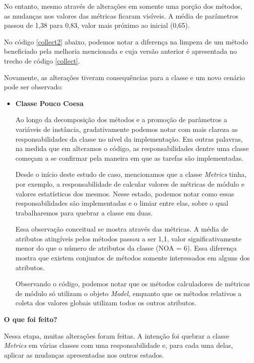 No entanto, mesmo através de alterações em somente uma porção dos métodos, as
mudanças nos valores das métricas ficaram visíveis. A média de parâmetros passou
de 1,38 para 0,83, valor mais próximo ao inicial (0,65).

No código \ref{collect2} abaixo, podemos notar a diferença na limpeza de um método
beneficiado pela melhoria mencionada e cuja versão anterior é apresentada no trecho
de código \ref{collect}.



Novamente, as alterações tiveram consequências para a classe e um novo cenário pode
ser observado:

\begin{itemize}
\item
\textbf{Classe Pouco Coesa}

Ao longo da decomposição dos métodos e a promoção de parâmetros a variáveis de instância,
gradativamente podemos notar com mais clareza as responsabilidades da classe no nível da
implementação. Em outras palavras, na medida que em alteramos o código, as responsabilidades
dentre uma classe começam a se confirmar pela maneira em que as tarefas são implementadas.

Desde o início deste estudo de caso, mencionamos que a classe \textit{Metrics} tinha, por exemplo, a
responsabilidade de calcular valores de métricas de módulo e valores estatísticos dos mesmos.
Nesse estado, podemos notar como essas responsabilidades são implementadas e o limiar entre elas,
sobre o qual trabalharemos para quebrar a classe em duas.

Essa observação conceitual se mostra através das métricas. A média de atributos atingíveis
pelos métodos passou a ser 1,1, valor significativamente menor do que o número de atributos
da classe (NOA = 6). Essa diferença mostra que existem conjuntos de métodos somente interessados
em alguns dos atributos.

Observando o código, podemos notar que os métodos calculadores de métricas de módulo só utilizam
o objeto \textit{Model}, enquanto que os métodos relativos a coleta dos valores globais utilizam
todos os outros atributos.

\end{itemize}


\vskip 0.5cm
\textbf{O que foi feito?}

Nessa etapa, muitas alterações foram feitas. A intenção foi quebrar a classe \textit{Metrics}
em várias classes com uma responsabilidade e, para cada uma delas, aplicar as mudanças apresentadas
nos outros estados.


